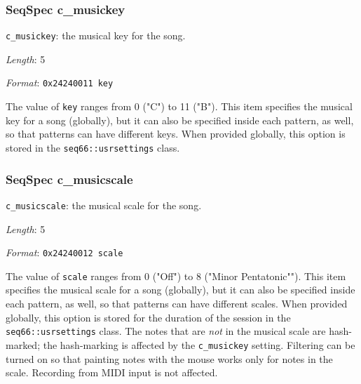 \subsubsection{SeqSpec c\_musickey}
\label{subsubsec:midi_format_track_seqspec_musickey}

   \begin{description}
      \item \texttt{c\_musickey}: the musical key for the song.
      \item \textsl{Length}: 5
      \item \textsl{Format}: \texttt{0x24240011 key}
   \end{description}

   The value of \texttt{key} ranges from 0 ("C") to 11 ("B").
   This item specifies the musical key for a song (globally), but it
   can also be specified inside each pattern, as well, so that patterns
   can have different keys.
   When provided globally, this option is stored in the
   \texttt{seq66::usrsettings} class.

\subsubsection{SeqSpec c\_musicscale}
\label{subsubsec:midi_format_track_seqspec_musicscale}

   \begin{description}
      \item \texttt{c\_musicscale}: the musical scale for the song.
      \item \textsl{Length}: 5
      \item \textsl{Format}: \texttt{0x24240012 scale}
   \end{description}

   The value of \texttt{scale} ranges from 0 ("Off") to 8 ("Minor Pentatonic"").
   This item specifies the musical scale for a song (globally), but it
   can also be specified inside each pattern, as well, so that patterns
   can have different scales.
   When provided globally, this option is stored for the duration
   of the session in the
   \texttt{seq66::usrsettings} class.
   The notes that are \textsl{not} in the musical scale are
   hash-marked;
   the hash-marking is affected by the \texttt{c\_musickey} setting.
   Filtering can be turned on so that painting notes with
   the mouse works only for notes in the scale.
   Recording from MIDI input is not affected.

